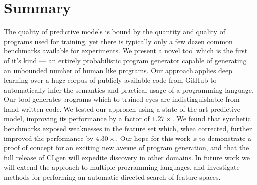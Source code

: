 \section{Summary}%
\label{sec:conclusion}

The quality of predictive models is bound by the quantity and quality of programs used for training, yet there is typically only a few dozen common benchmarks available for experiments. We present a novel tool which is the first of it's kind --- an entirely probabilistic program generator capable of generating an unbounded number of human like programs. Our approach applies deep learning over a huge corpus of publicly available code from GitHub to automatically infer the semantics and practical usage of a programming language. Our tool generates programs which to trained eyes are indistinguishable from hand-written code. We tested our approach using a state of the art predictive model, improving its performance by a factor of $1.27\times$. We found that synthetic benchmarks exposed weaknesses in the feature set which, when corrected, further improved the performance by $4.30\times$. Our hope for this work is to demonstrate a proof of concept for an exciting new avenue of program generation, and that the full release of CLgen will expedite discovery in other domains. In future work we will extend the approach to multiple programming languages, and investigate methods for performing an automatic directed search of feature spaces.

